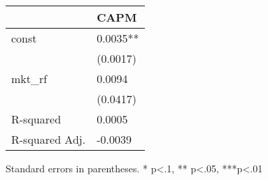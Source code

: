 \begin{table}
\caption{}
\label{}
\begin{center}
\begin{tabular}{ll}
\hline
               & CAPM      \\
\hline
const          & 0.0035**  \\
               & (0.0017)  \\
mkt\_rf        & 0.0094    \\
               & (0.0417)  \\
R-squared      & 0.0005    \\
R-squared Adj. & -0.0039   \\
\hline
\end{tabular}
\end{center}
\end{table}
\bigskip
Standard errors in parentheses. \newline 
* p<.1, ** p<.05, ***p<.01